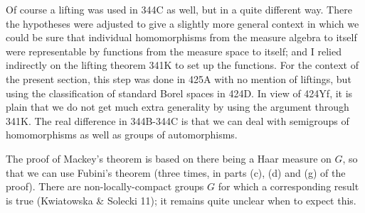 {Of course a lifting was used in 344C as well, but in a quite different way.
There the hypotheses were adjusted to give a slightly more general context
in which we could be sure that individual homomorphisms from the measure
algebra to itself were representable by functions from the measure space to
itself;  and I relied indirectly on the lifting theorem 341K
to set up the functions.   For the context of the present section,
this step was done in 425A with no mention of
liftings, but using the classification of standard Borel spaces in 424D.
In view of 424Yf, it is plain that we do not get much extra generality by
using the argument through 341K.   The real difference in 344B-344C is that
we can deal with semigroups of homomorphisms as well as groups of
automorphisms.

The proof of Mackey's theorem is based on there being a Haar measure on
$G$, so that we can use Fubini's theorem
(three times, in parts (c), (d) and (g) of the
proof).   There are non-locally-compact groups $G$ for which a
corresponding result is true ({\smc Kwiatowska \& Solecki 11});
it remains quite unclear when to expect this.
}%

\discrpage


